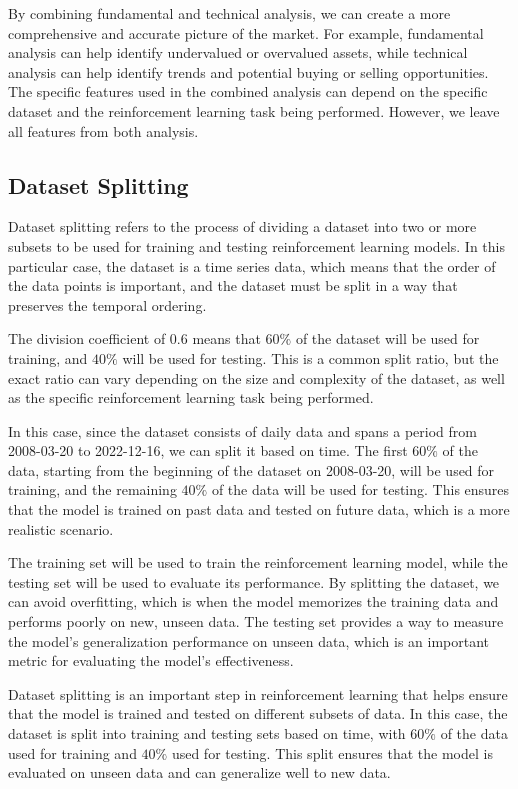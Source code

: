 \documentclass[../xlapes02]{subfiles}
\begin{document}
    By combining fundamental and technical analysis, we can create a more comprehensive and accurate picture of the market. For example, fundamental analysis can help identify undervalued or overvalued assets, while technical analysis can help identify trends and potential buying or selling opportunities. The specific features used in the combined analysis can depend on the specific dataset and the reinforcement learning task being performed. However, we leave all features from both analysis.

    \subsection{Dataset Splitting}\label{subsec:dataset-splitting}
    Dataset splitting refers to the process of dividing a dataset into two or more subsets to be used for training and testing reinforcement learning models. In this particular case, the dataset is a time series data, which means that the order of the data points is important, and the dataset must be split in a way that preserves the temporal ordering.

    The division coefficient of $0.6$ means that $60\%$ of the dataset will be used for training, and $40\%$ will be used for testing. This is a common split ratio, but the exact ratio can vary depending on the size and complexity of the dataset, as well as the specific reinforcement learning task being performed.

    In this case, since the dataset consists of daily data and spans a period from 2008-03-20 to 2022-12-16, we can split it based on time. The first $60\%$ of the data, starting from the beginning of the dataset on 2008-03-20, will be used for training, and the remaining $40\%$ of the data will be used for testing. This ensures that the model is trained on past data and tested on future data, which is a more realistic scenario.

    The training set will be used to train the reinforcement learning model, while the testing set will be used to evaluate its performance. By splitting the dataset, we can avoid overfitting, which is when the model memorizes the training data and performs poorly on new, unseen data. The testing set provides a way to measure the model's generalization performance on unseen data, which is an important metric for evaluating the model's effectiveness.

    Dataset splitting is an important step in reinforcement learning that helps ensure that the model is trained and tested on different subsets of data. In this case, the dataset is split into training and testing sets based on time, with $60\%$ of the data used for training and $40\%$ used for testing. This split ensures that the model is evaluated on unseen data and can generalize well to new data.
\end{document}
